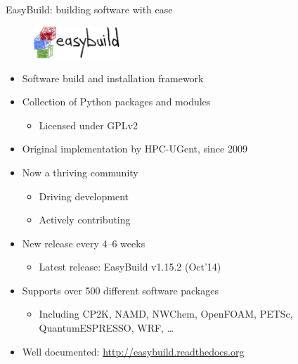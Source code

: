 \documentclass[10pt,xcolor={usenames,dvipsnames}]{beamer}
\begin{document}
\begin{frame}{EasyBuild: building software with ease}
\begin{figure}[centering]
    \includegraphics[height=1.2cm]{easybuild_logo.jpg}
\end{figure}
\begin{itemize}
    \item
        Software build and installation framework
    \item
        Collection of Python packages and modules
        \begin{itemize}
            \item
                Licensed under GPLv2
        \end{itemize}
    \item
        Original implementation by HPC-UGent, since 2009
    \item
        Now a thriving community
        \begin{itemize}
            \item Driving development
            \item Actively contributing
        \end{itemize}
    \item
        New release every 4--6 weeks
        \begin{itemize}
            \item Latest release: EasyBuild v1.15.2 (Oct'14)
        \end{itemize}
    \item
        Supports over 500 different software packages
        \begin{itemize}
            \item
                Including CP2K, NAMD, NWChem, OpenFOAM, PETSc, QuantumESPRESSO,
                WRF, \ldots
        \end{itemize}
    \item
        Well documented: \url{http://easybuild.readthedocs.org}
\end{itemize}
\end{frame}


\end{document}
